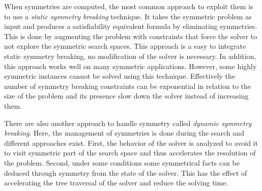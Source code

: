 When symmetries are computed, the most common approach to exploit them is to use a \emph{static symmetry breaking} technique.
It takes the symmetric problem as input and produces a satisfiability equivalent formula by eliminating symmetries. This is done by augmenting the problem with constraints that force the solver to not explore the symmetric search  spaces.
This approach is a easy to integrate static symmetry breaking, no modification of the solver is necessary.
In addition, this approach works well on many symmetric applications.
However, some highly symmetric instances cannot be solved using this technique. Effectively the number of
symmetry breaking constraints can be exponential in relation to the size of the problem and its presence slow down the solver
instead of increasing them.

There are also another approach to handle symmetry called \emph{dynamic symmetry breaking}. Here, the management of
symmetries is done during the search and different approaches exist. First, the behavior of the solver is analyzed to avoid 
it to visit symmetric part of the search space and thus accelerates the resolution of the problem.
Second, under some conditions some symmetrical facts can be deduced through symmetry from the
state of the solver. This has the effect of accelerating the tree traversal of the solver and reduce the solving time.

%
%
%
%
%
%


